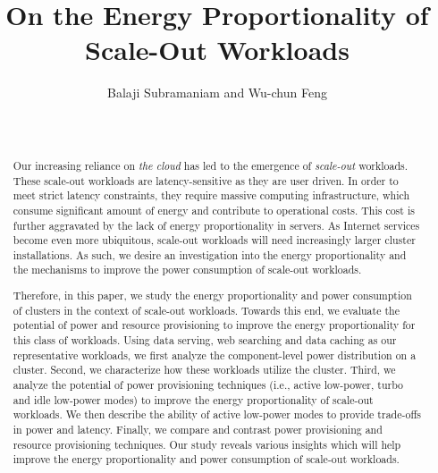 \documentclass{sig-alternate}
\begin{document}
\title{On the Energy Proportionality of Scale-Out Workloads}

\author{
\alignauthor
Balaji Subramaniam and Wu-chun Feng\\
       \\
       \\
}


\maketitle

\begin{abstract}

Our increasing reliance on \emph{the cloud} has led to the 
emergence of \emph{scale-out} workloads. These scale-out workloads are latency-sensitive 
as they are user driven. In order to meet strict latency constraints, 
they require massive computing infrastructure, which consume
significant amount of energy and contribute to operational costs. This
cost is further aggravated by the lack of energy proportionality in
servers. As Internet services become even more ubiquitous, 
scale-out workloads will need increasingly larger cluster
installations. As such, we desire an investigation into the energy 
proportionality and the mechanisms to improve the power consumption of 
scale-out workloads. 

Therefore, in this paper, we study the energy proportionality and power consumption of
clusters in the context of scale-out workloads. Towards this end, we 
evaluate the potential of power and resource provisioning to improve the 
energy proportionality for this class of workloads. Using data serving, 
web searching and data caching as our representative workloads, we first 
analyze the component-level power distribution on a cluster. Second, we 
characterize how these workloads utilize the cluster. Third, we analyze 
the potential of power provisioning techniques (i.e., active low-power, turbo and
idle low-power modes) to improve the energy proportionality of scale-out workloads. 
We then describe the ability of active low-power modes to provide trade-offs 
in power and latency. Finally, we compare and contrast power provisioning 
and resource provisioning techniques. Our study 
reveals various insights which will help improve the energy proportionality and 
power consumption of scale-out workloads. 

\end{abstract}
 
\end{document}
